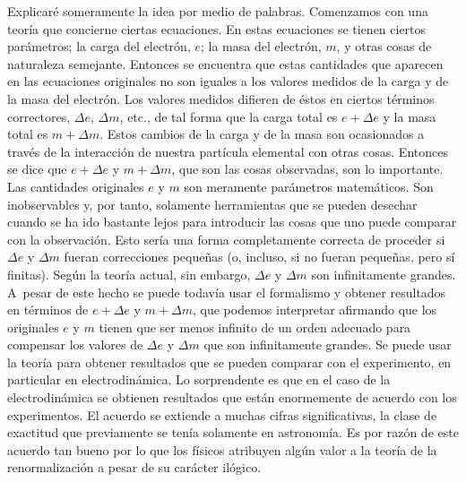 \documentclass[a4paper, 12pt]{article}
\begin{document}
Explicaré someramente la idea por medio de palabras. Comenzamos con una teoría que concierne ciertas ecuaciones. En estas ecuaciones se tienen ciertos parámetros; la carga del electrón, $e$; la masa del electrón, $m$, y otras cosas de naturaleza semejante. Entonces se encuentra que estas cantidades que aparecen en las ecuaciones originales no son iguales a los valores medidos de la carga y de la masa del electrón. Los valores medidos difieren de éstos en ciertos términos correctores, $\Delta e$, $\Delta m$, etc., de tal forma que la carga total es $e +\Delta e$ y la masa total es $m+\Delta m$. Estos cambios de la carga y de la masa son ocasionados a través de la interacción de nuestra partícula elemental con otras cosas. Entonces se dice que $e +\Delta e$ y $m + \Delta m$, que son las cosas observadas, son lo importante. Las cantidades originales $e$ y $m$ son meramente parámetros matemáticos. Son inobservables y, por tanto, solamente herramientas que se pueden desechar cuando se ha ido bastante lejos para introducir las cosas que uno puede comparar con la observación. Esto sería una forma completamente correcta de proceder si $\Delta e$ y $\Delta m$ fueran correcciones pequeñas (o, incluso, si no fueran pequeñas, pero sí finitas). Según la teoría actual, sin embargo, $\Delta e$ y $\Delta m$ son infinitamente grandes. A~pesar de este hecho se puede todavía usar el formalismo y obtener resultados en términos de $e +\Delta e$ y $m + \Delta m$, que podemos interpretar afirmando que los originales $e$ y $m$ tienen que ser menos infinito de un orden adecuado para compensar los valores de $\Delta e$ y $\Delta m$ que son infinitamente grandes. Se puede
usar la teoría para obtener resultados que se pueden comparar con el experimento, en particular en electrodinámica. Lo sorprendente es que en el caso de la electrodinámica se obtienen resultados que están enormemente de acuerdo con los experimentos. El acuerdo se extiende a muchas cifras significativas, la clase de exactitud que previamente se tenía solamente en astronomía. Es por razón de este acuerdo tan bueno por lo que los físicos atribuyen algún valor a la teoría de la renormalización a pesar de su carácter ilógico.
\end{document}
